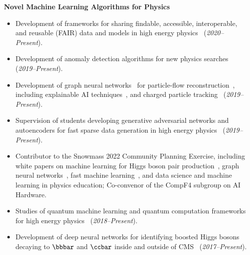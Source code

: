 \documentclass[11pt]{res}
\begin{document}
\begin{resume}
  \textbf{Novel Machine Learning Algorithms for Physics}
  \begin{itemize}
    \item Development of frameworks for sharing findable, accessible, interoperable, and reusable (FAIR) data and models in high energy physics~\cite{Chen:2021euv} (\textit{2020--Present}).
    \item Development of anomaly detection algorithms for new physics searches~\cite{Govorkova:2021utb,Jawahar:2021vyu,Aarrestad:2021oeb,Tsan:2021brw,Kasieczka:2021xcg,Wozniak:2020} (\textit{2019--Present}).
    \item Development of graph neural networks~\cite{Duarte:2020ngm} for particle-flow reconstruction~\cite{Pata:2022wam,CMS-DP-2021-030,Pata:2021oez}, including explainable AI techniques~\cite{Mokhtar:2021bkf}, and charged particle tracking~\cite{Elabd:2021lgo,Dezoort:2021kfk,Heintz:2020soy} (\textit{2019--Present}).
    \item Supervision of students developing generative adversarial networks and autoencoders for fast sparse data generation in high energy physics~\cite{Touranakou:2022qrp,Kansal:2021cqp,Orzari:2021suh,Kansal:2020svm} (\textit{2019--Present}).
    \item Contributor to the Snowmass 2022 Community Planning Exercise, including white papers on machine learning for Higgs boson pair production~\cite{Apresyan:2022tqw}, graph neural networks~\cite{Thais:2022iok}, fast machine learning~\cite{Harris:2022qtm}, and data science and machine learning in physics education; Co-convenor of the CompF4 subgroup on AI Hardware.
    \item Studies of quantum machine learning and quantum computation frameworks for high energy physics~\cite{Zlokapa:2019tkn} (\textit{2018--Present}).
    \item Development of deep neural networks for identifying boosted Higgs bosons decaying to $\bbbar$ and $\ccbar$ inside and outside of  CMS~\cite{Moreno:2019neq,Moreno:2019bmu,neurips2019_hbb,CMS-DP-2018-046} (\textit{2017--Present}).
  \end{itemize}


\end{resume}
\end{document}
